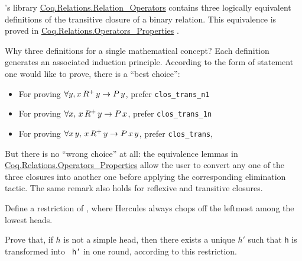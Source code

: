 \begin{remark}
\label{remark:transitive-closure}
\coq's library \href{https://coq.inria.fr/distrib/current/stdlib/Coq.Relations.Relation_Operators.html}{Coq.Relations.Relation\_Operators} 
contains three logically equivalent definitions of the transitive closure of a binary relation. This equivalence is proved in 
\href{https://coq.inria.fr/distrib/current/stdlib/Coq.Relations.Operators_Properties.html}{Coq.Relations.Operators\_Properties} . 

Why three definitions for a single mathematical concept?
Each definition generates an associated induction principle. 
 According to the form of statement one would like to prove, there is a ``best choice'':

\begin{itemize}
\item For proving $\forall y, x\,R^+\,y \;\mbox{$\rightarrow$}\; P\,y$, prefer 
\texttt{clos\_trans\_n1}
\item For proving $\forall x,\,x\,R^+\,y \;\mbox{$\rightarrow$}\; P\,x$, prefer \texttt{clos\_trans\_1n}
\item For proving $\forall x\,y, \,x\,R^+\,y \;\mbox{$\rightarrow$}\;P\,x\,y$,  
prefer \texttt{clos\_trans},
\end{itemize}
But there is no ``wrong choice'' at all: the equivalence lemmas in \linebreak 
\href{https://coq.inria.fr/distrib/current/stdlib/Coq.Relations.Operators_Properties.html}{Coq.Relations.Operators\_Properties} 
 allow the user
to convert any one of the three closures into another one before applying the corresponding elimination tactic.
The same remark also holds for reflexive and transitive closures. 
\end{remark}


\begin{exercise}
Define a restriction of ,  where Hercules always chops off
the leftmost among the lowest heads.

Prove that, if $h$ is not a simple head, then there exists a unique $h'$ such that \texttt{h}  is transformed into \texttt{ h'} in one round, according to this restriction.


\end{exercise}


